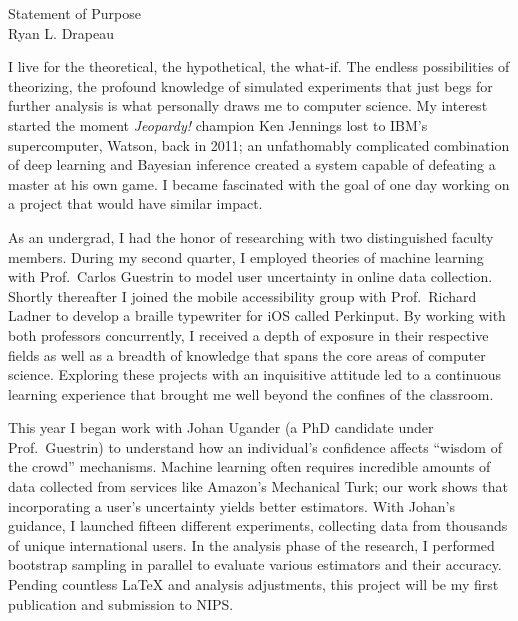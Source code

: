 \setlength{\oddsidemargin}{0in}
\setlength{\evensidemargin}{0in}
\setlength{\textwidth}{6.5in}
\setlength{\topmargin}{-.65in}
\setlength{\textheight}{9.5in}
\pagestyle{empty}



\begin{center}
    {\Large Statement of Purpose}\\[3 mm]
    {\large Ryan L. Drapeau}
\end{center}

I live for the theoretical, the hypothetical, the what-if. The endless possibilities of theorizing,
the profound knowledge of simulated experiments that just begs for further analysis is what personally draws me to computer science. My interest started the moment {\it{Jeopardy!}} champion Ken Jennings lost to IBM's supercomputer, Watson, back in 2011; an unfathomably complicated combination of deep learning and Bayesian inference created a system capable of defeating a master at his own game. I became fascinated with the goal of one day working on a project that would have similar impact.\vspace{2 mm}

As an undergrad, I had the honor of researching with two distinguished faculty members. During my second quarter, I employed theories of machine learning with Prof.\ Carlos Guestrin to model user uncertainty in online data collection. Shortly thereafter I joined the mobile accessibility group with Prof.\ Richard Ladner to develop a braille typewriter for iOS called Perkinput. By working with both professors concurrently, I received a depth of exposure in their respective fields as well as a breadth of knowledge that spans the core areas of computer science. Exploring these projects with an inquisitive attitude led to a continuous learning experience that brought me well beyond the confines of the classroom.\vspace{2 mm}

This year I began work with Johan Ugander (a PhD candidate under Prof.\ Guestrin) to understand how an individual's confidence affects ``wisdom of the crowd'' mechanisms. Machine learning often requires incredible amounts of data collected from services like Amazon's Mechanical Turk; our work shows that incorporating a user’s uncertainty yields better estimators. With Johan's guidance, I launched fifteen different experiments, collecting data from thousands of unique international users. In the analysis phase of the research, I performed bootstrap sampling in parallel to evaluate various estimators and their accuracy. Pending countless \LaTeX{} and analysis adjustments, this project will be my first publication and submission to NIPS.\vspace{2 mm}

